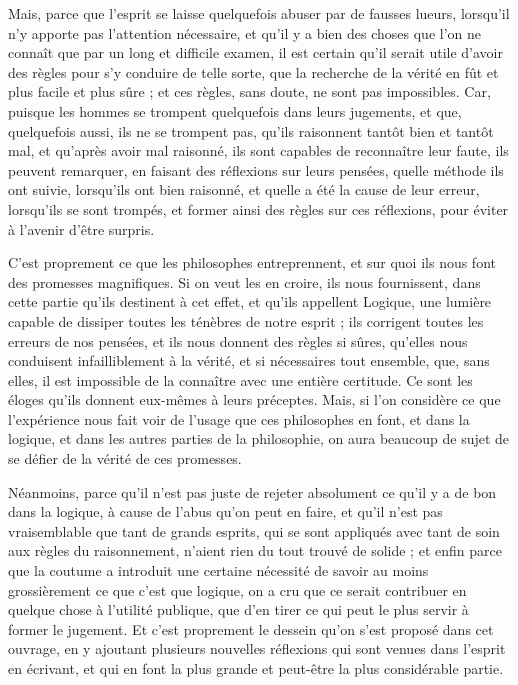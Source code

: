 Mais, parce que l'esprit se laisse quelquefois abuser par de fausses lueurs, lorsqu'il n'y apporte pas l'attention nécessaire, et qu'il y a bien des choses que l'on ne connaît que par un long et difficile examen, il est certain qu'il serait utile d'avoir des règles pour s'y conduire de telle sorte, que la recherche de la vérité en fût et plus facile et plus sûre ; et ces règles, sans doute, ne sont pas impossibles. Car, puisque les hommes se trompent quelquefois dans leurs jugements, et que, quelquefois aussi, ils ne se trompent pas, qu'ils raisonnent tantôt bien et tantôt mal, et qu'après avoir mal raisonné, ils sont capables de reconnaître leur faute, ils peuvent remarquer, en faisant des réflexions sur leurs pensées, quelle méthode ils ont suivie, lorsqu'ils ont bien raisonné, et quelle a été la cause de leur erreur, lorsqu'ils se sont trompés, et former ainsi des règles sur ces réflexions, pour éviter à l'avenir d'être surpris.

C'est proprement ce que les philosophes entreprennent, et sur quoi ils nous font des promesses magnifiques. Si on veut les en croire, ils nous fournissent, dans cette partie qu'ils destinent à cet effet, et qu'ils appellent Logique, une lumière capable de dissiper toutes les ténèbres de notre esprit ; ils corrigent toutes les erreurs de nos pensées, et ils nous donnent des règles si sûres, qu'elles nous conduisent infailliblement à la vérité, et si nécessaires tout ensemble, que, sans elles, il est impossible de la connaître avec une entière certitude. Ce sont les éloges qu'ils donnent eux-mêmes à leurs préceptes. Mais, si l'on considère ce que l'expérience nous fait voir de l'usage que ces philosophes en font, et dans la logique, et dans les autres parties de la philosophie, on aura beaucoup de sujet de se défier de la vérité de ces promesses.

Néanmoins, parce qu'il n'est pas juste de rejeter absolument ce qu'il y a de bon dans la logique, à cause de l'abus qu'on peut en faire, et qu'il n'est pas vraisemblable que tant de grands esprits, qui se sont appliqués avec tant de soin aux règles du raisonnement, n'aient rien du tout trouvé de solide ; et enfin parce que la coutume a introduit une certaine nécessité de savoir au moins grossièrement ce que c'est que logique, on a cru que ce serait contribuer en quelque chose à l'utilité publique, que d'en tirer ce qui peut le plus servir à former le jugement. Et c'est proprement le dessein qu'on s'est proposé dans cet ouvrage, en y ajoutant plusieurs nouvelles réflexions qui sont venues dans l'esprit en écrivant, et qui en font la plus grande et peut-être la plus considérable partie.

